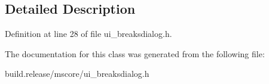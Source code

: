 \subsection{Detailed Description}


Definition at line 28 of file ui\+\_\+breaksdialog.\+h.



The documentation for this class was generated from the following file\+:\begin{DoxyCompactItemize}
\item 
build.\+release/mscore/ui\+\_\+breaksdialog.\+h\end{DoxyCompactItemize}
